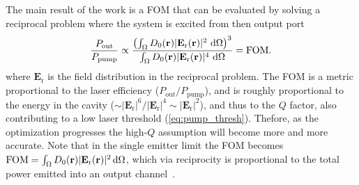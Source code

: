 The main result of the work is a FOM that can be evaluated by solving a reciprocal problem where the system is excited from then output port~\cite{ownpub4}
\begin{equation}\label{eq:eff_nl}
    \frac{P_\text{out}}{P_\text{pump}} \propto \frac{\left( \int_{\Omega} D_0(\mathbf{r})|\mathbf{E}_{\text{r}}(\mathbf{r})|^2 \,  \mathop{}\!\text{d} \Omega \right)^3} {\int_{\Omega} D_0(\mathbf{r}) |\mathbf{E}_{\text{r}}(\mathbf{r})|^4 \,  \mathop{}\!\text{d} \Omega} = \text{FOM}.
\end{equation}
where $\mathbf{E}_{\text{r}}$ is the field distribution in the reciprocal problem. The FOM is a metric proportional to the laser efficiency ($P_\text{out}/P_\text{pump}$), and is roughly proportional 
to the energy in the cavity ($\sim |\mathbf{E}_{\text{r}}|^6 / |\mathbf{E}_{\text{r}}|^4 \sim |\mathbf{E}_{\text{r}}|^2$), and thus to the $Q$ factor, also contributing to a low
laser threshold (\eqref{eq:pump_thresh}). Thefore, as the optimization progresses the high-$Q$ assumption will become more and more accurate. Note that in the single emitter limit the FOM becomes
$\text{FOM}=\int_{\Omega} D_0(\mathbf{r}) |\mathbf{E}_{\text{r}}(\mathbf{r})|^2 \mathop{}\!\text{d} \Omega$, which via reciprocity is proportional to the total power emitted into an output channel~\cite[App.~C]{reci}. 

